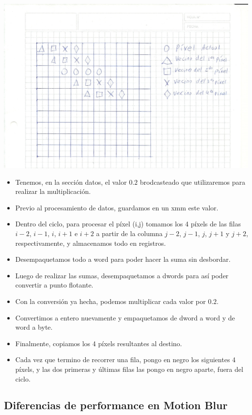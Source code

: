 \documentclass[a4paper]{article}
\begin{document}
\includegraphics[scale=0.66]{Dibujos/MB1.jpg}

\begin{itemize}
\item  Tenemos, en la sección datos, el valor $0.2$ brodcasteado que utilizaremos para realizar la multiplicación.
\item  Previo al procesamiento de datos, guardamos en un xmm este valor.
\item  Dentro del ciclo, para procesar el píxel (i,j) tomamos los 4 píxels de las filas $i-2$, $i-1$, $i$, $i+1$ e $i+2$ a partir de la columna $j-2$, $j-1$, $j$, $j+1$ y $j+2$, respectivamente, y almacenamos todo en registros.
\item  Desempaquetamos todo a word para poder hacer la suma sin desbordar.
\item  Luego de realizar las sumas, desempaquetamos a dwords para así poder convertir a punto flotante.
\item  Con la conversión ya hecha, podemos multiplicar cada valor por $0.2$.
\item  Convertimos a entero nuevamente y empaquetamos de dword a word y de word a byte.
\item  Finalmente, copiamos los 4 píxels resultantes al destino. 
\item  Cada vez que termino de recorrer una fila, pongo en negro los siguientes 4 píxels, y las dos primeras y últimas filas las pongo en negro aparte, fuera del ciclo.
\end{itemize}

\subsection{Diferencias de performance en Motion Blur}
\end{document}

